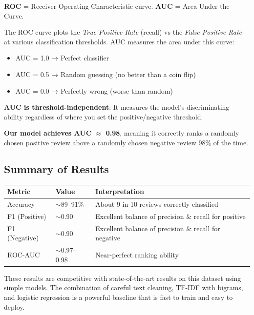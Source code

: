 \documentclass[12pt, a4paper]{article}
\begin{document}
\begin{conceptbox}
\textbf{ROC} = Receiver Operating Characteristic curve.
\textbf{AUC} = Area Under the Curve.

\medskip
The ROC curve plots the \emph{True Positive Rate} (recall) vs the \emph{False Positive Rate} at various classification thresholds. AUC measures the area under this curve:
\begin{itemize}
  \item AUC = 1.0 → Perfect classifier
  \item AUC = 0.5 → Random guessing (no better than a coin flip)
  \item AUC = 0.0 → Perfectly wrong (worse than random)
\end{itemize}

\textbf{AUC is threshold-independent}: It measures the model's discriminating ability regardless of where you set the positive/negative threshold.

\medskip
\textbf{Our model achieves AUC $\approx$ 0.98}, meaning it correctly ranks a randomly chosen positive review above a randomly chosen negative review 98\% of the time.
\end{conceptbox}

\subsection{Summary of Results}

\begin{center}
\begin{tabular}{lll}
\toprule
\textbf{Metric} & \textbf{Value} & \textbf{Interpretation} \\
\midrule
Accuracy  & $\sim$89--91\% & About 9 in 10 reviews correctly classified \\
F1 (Positive) & $\sim$0.90 & Excellent balance of precision \& recall for positive \\
F1 (Negative) & $\sim$0.90 & Excellent balance of precision \& recall for negative \\
ROC-AUC   & $\sim$0.97--0.98 & Near-perfect ranking ability \\
\bottomrule
\end{tabular}
\end{center}

\begin{whybox}
These results are competitive with state-of-the-art results on this dataset using simple models. The combination of careful text cleaning, TF-IDF with bigrams, and logistic regression is a powerful baseline that is fast to train and easy to deploy.
\end{whybox}
\end{document}
